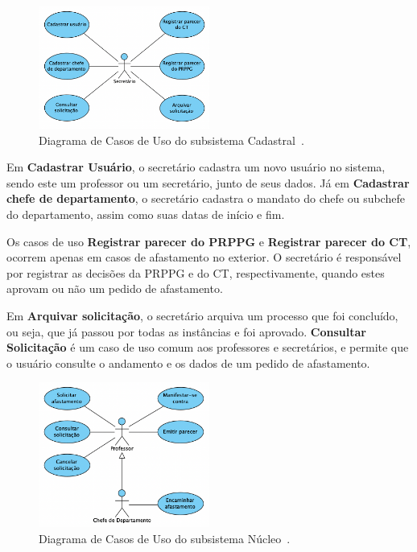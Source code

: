 \begin{figure}[h!]
    \centering
    \includegraphics[width=0.5\textwidth]{figuras/fig-caso-cadastral.png}
    \caption{Diagrama de Casos de Uso do subsistema Cadastral~\cite{prado:2015}.}
    \label{fig:casos-de-uso-cadastral}
\end{figure}

Em \textbf{Cadastrar Usuário}, o secretário cadastra um novo usuário no sistema, sendo
este um professor ou um secretário, junto de seus dados. Já em \textbf{Cadastrar chefe de departamento},
o secretário cadastra o mandato do chefe ou subchefe do departamento, assim como suas datas de início e fim.

Os casos de uso \textbf{Registrar parecer do PRPPG} e \textbf{Registrar parecer do CT}, ocorrem
apenas em casos de afastamento no exterior. O secretário é responsável por registrar as decisões
da PRPPG e do CT, respectivamente, quando estes aprovam ou não um pedido de afastamento.

Em \textbf{Arquivar solicitação}, o secretário arquiva um processo que foi concluído, ou seja, que
já passou por todas as instâncias e foi aprovado. \textbf{Consultar Solicitação} é um caso de uso
comum aos professores e secretários, e permite que o usuário consulte o andamento e os dados de um
pedido de afastamento.


\begin{figure}[h!]
    \centering
    \includegraphics[width=0.5\textwidth]{figuras/fig-caso-nucleo.png}
    \caption{Diagrama de Casos de Uso do subsistema Núcleo~\cite{prado:2015}.}
    \label{fig:casos-de-uso-nucleo}
\end{figure}


